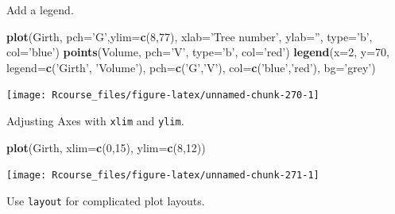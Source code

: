 \documentclass[]{book}
\newenvironment{Shaded}{\begin{snugshade}}{\end{snugshade}}
\newcommand{\DataTypeTok}[1]{\textcolor[rgb]{0.13,0.29,0.53}{#1}}
\newcommand{\DecValTok}[1]{\textcolor[rgb]{0.00,0.00,0.81}{#1}}
\newcommand{\KeywordTok}[1]{\textcolor[rgb]{0.13,0.29,0.53}{\textbf{#1}}}
\newcommand{\NormalTok}[1]{#1}
\newcommand{\StringTok}[1]{\textcolor[rgb]{0.31,0.60,0.02}{#1}}
\theoremstyle{definition}
\theoremstyle{definition}
\theoremstyle{definition}
\theoremstyle{remark}
\begin{document}
Add a legend.

\begin{Shaded}
\begin{Highlighting}[]
\KeywordTok{plot}\NormalTok{(Girth, }\DataTypeTok{pch=}\StringTok{'G'}\NormalTok{,}\DataTypeTok{ylim=}\KeywordTok{c}\NormalTok{(}\DecValTok{8}\NormalTok{,}\DecValTok{77}\NormalTok{), }\DataTypeTok{xlab=}\StringTok{'Tree number'}\NormalTok{, }\DataTypeTok{ylab=}\StringTok{''}\NormalTok{, }\DataTypeTok{type=}\StringTok{'b'}\NormalTok{, }\DataTypeTok{col=}\StringTok{'blue'}\NormalTok{)}
\KeywordTok{points}\NormalTok{(Volume, }\DataTypeTok{pch=}\StringTok{'V'}\NormalTok{, }\DataTypeTok{type=}\StringTok{'b'}\NormalTok{, }\DataTypeTok{col=}\StringTok{'red'}\NormalTok{)}
\KeywordTok{legend}\NormalTok{(}\DataTypeTok{x=}\DecValTok{2}\NormalTok{, }\DataTypeTok{y=}\DecValTok{70}\NormalTok{, }\DataTypeTok{legend=}\KeywordTok{c}\NormalTok{(}\StringTok{'Girth'}\NormalTok{, }\StringTok{'Volume'}\NormalTok{), }\DataTypeTok{pch=}\KeywordTok{c}\NormalTok{(}\StringTok{'G'}\NormalTok{,}\StringTok{'V'}\NormalTok{), }\DataTypeTok{col=}\KeywordTok{c}\NormalTok{(}\StringTok{'blue'}\NormalTok{,}\StringTok{'red'}\NormalTok{), }\DataTypeTok{bg=}\StringTok{'grey'}\NormalTok{)}
\end{Highlighting}
\end{Shaded}

\texttt{[image: Rcourse\_files/figure-latex/unnamed-chunk-270-1]}

Adjusting Axes with \texttt{xlim} and \texttt{ylim}.

\begin{Shaded}
\begin{Highlighting}[]
\KeywordTok{plot}\NormalTok{(Girth, }\DataTypeTok{xlim=}\KeywordTok{c}\NormalTok{(}\DecValTok{0}\NormalTok{,}\DecValTok{15}\NormalTok{), }\DataTypeTok{ylim=}\KeywordTok{c}\NormalTok{(}\DecValTok{8}\NormalTok{,}\DecValTok{12}\NormalTok{))}
\end{Highlighting}
\end{Shaded}

\texttt{[image: Rcourse\_files/figure-latex/unnamed-chunk-271-1]}

Use \texttt{layout} for complicated plot layouts.
\end{document}
